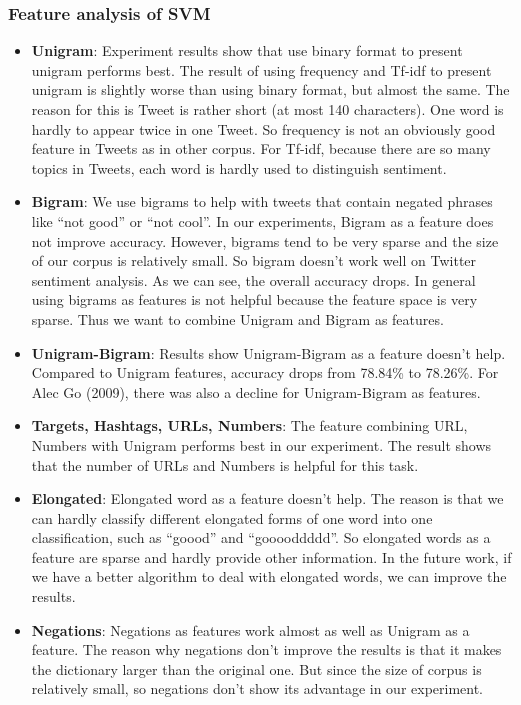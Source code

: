 \subsubsection{Feature analysis of SVM}
\begin{itemize}
\item \textbf{Unigram}: Experiment results show that use binary format to present unigram performs best. The result of using frequency and Tf-idf to present unigram is slightly worse than using binary format, but almost the same. The reason for this is Tweet is rather short (at most 140 characters). One word is hardly to appear twice in one Tweet. So frequency is not an obviously good feature in Tweets as in other corpus. For Tf-idf, because there are so many topics in Tweets, each word is hardly used to distinguish sentiment.

\item \textbf{Bigram}: We use bigrams to help with tweets that contain negated phrases like “not good” or “not cool”. In our experiments, Bigram as a feature does not improve accuracy. However, bigrams tend to be very sparse and the size of our corpus is relatively small. So bigram doesn’t work well on Twitter sentiment analysis. As we can see, the overall accuracy drops. In general using bigrams as features is not helpful because the feature space is very sparse. Thus we want to combine Unigram and Bigram as features. 

\item \textbf{Unigram-Bigram}: Results show Unigram-Bigram as a feature doesn’t help. Compared to Unigram features, accuracy drops from 78.84\% to 78.26\%. For Alec Go (2009), there was also a decline for Unigram-Bigram as features. 

\item \textbf{Targets, Hashtags, URLs, Numbers}: The feature combining URL, Numbers with Unigram performs best in our experiment. The result shows that the number of URLs and Numbers is helpful for this task. 

\item \textbf{Elongated}:  Elongated word as a feature doesn’t help. The reason is that we can hardly classify different elongated forms of one word into one classification, such as “goood” and “gooooddddd”. So elongated words as a feature are sparse and hardly provide other information. In the future work, if we have a better algorithm to deal with elongated words, we can improve the results. 

\item \textbf{Negations}: Negations as features work almost as well as Unigram as a feature. The reason why negations don’t improve the results is that it makes the dictionary larger than the original one. But since the size of corpus is relatively small, so negations don’t show its advantage in our experiment. 

\end{itemize}

